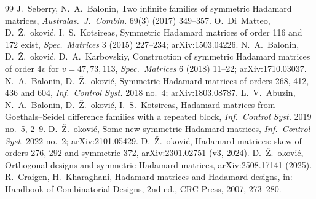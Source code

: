 \documentclass[11pt]{article}
\numberwithin{equation}{section}
\theoremstyle{definition}
\theoremstyle{remark}
\begin{document}
\begin{thebibliography}{99}
 J.~Seberry, N.~A.~Balonin, Two infinite families of symmetric Hadamard matrices,
\emph{Australas.\ J.\ Combin.} 69(3) (2017) 349--357.
 O.~Di~Matteo, D.~\v{Z}.~\DJ{}okovi\'c, I.~S.~Kotsireas, Symmetric Hadamard matrices of order 116
and 172 exist, \emph{Spec.\ Matrices} 3 (2015) 227--234; arXiv:1503.04226.
 N.~A.~Balonin, D.~\v{Z}.~\DJ{}okovi\'c, D.~A.~Karbovskiy, Construction of symmetric Hadamard
matrices of order $4v$ for $v=47,73,113$, \emph{Spec.\ Matrices} 6 (2018) 11--22; arXiv:1710.03037.
 N.~A.~Balonin, D.~\v{Z}.~\DJ{}okovi\'c, Symmetric Hadamard matrices of orders 268, 412, 436 and
604, \emph{Inf.\ Control Syst.} 2018 no.~4; arXiv:1803.08787.
 L.~V.~Abuzin, N.~A.~Balonin, D.~\v{Z}.~\DJ{}okovi\'c, I.~S.~Kotsireas, Hadamard matrices from
Goethals--Seidel difference families with a repeated block, \emph{Inf.\ Control Syst.} 2019 no.~5, 2--9.
 D.~\v{Z}.~\DJ{}okovi\'c, Some new symmetric Hadamard matrices, \emph{Inf.\ Control Syst.} 2022
no.~2; arXiv:2101.05429.
 D.~\v{Z}.~\DJ{}okovi\'c, Hadamard matrices: skew of orders 276, 292 and symmetric 372,
arXiv:2301.02751 (v3, 2024).
 D.~\v{Z}.~\DJ{}okovi\'c, Orthogonal designs and symmetric Hadamard matrices, arXiv:2508.17141 (2025).
 R.~Craigen, H.~Kharaghani, Hadamard matrices and Hadamard designs, in: Handbook of
Combinatorial Designs, 2nd ed., CRC Press, 2007, 273--280.
\end{thebibliography}
\end{document}
